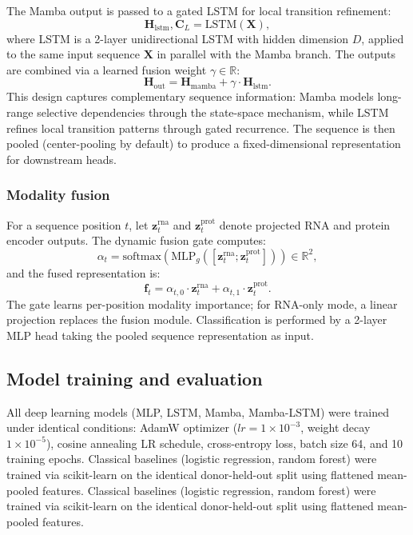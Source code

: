 \documentclass[11pt,twocolumn]{article}
\begin{document}
The Mamba output is passed to a gated LSTM for local transition refinement:
\begin{equation}
\mathbf{H}_{\text{lstm}}, \mathbf{C}_L = \text{LSTM}(\mathbf{X}),
\end{equation}
where LSTM is a 2-layer unidirectional LSTM with hidden dimension $D$, applied to the same input sequence $\mathbf{X}$ in parallel with the Mamba branch. The outputs are combined via a learned fusion weight $\gamma \in \mathbb{R}$:
\begin{equation}
\mathbf{H}_{\text{out}} = \mathbf{H}_{\text{mamba}} + \gamma \cdot \mathbf{H}_{\text{lstm}}.
\end{equation}
This design captures complementary sequence information: Mamba models long-range selective dependencies through the state-space mechanism, while LSTM refines local transition patterns through gated recurrence. The sequence is then pooled (center-pooling by default) to produce a fixed-dimensional representation for downstream heads.

\subsubsection{Modality fusion}

For a sequence position $t$, let $\mathbf{z}^{\mathrm{rna}}_t$ and $\mathbf{z}^{\mathrm{prot}}_t$ denote projected RNA and protein encoder outputs. The dynamic fusion gate computes:
\begin{equation}
\alpha_t = \text{softmax}\left(\text{MLP}_g([\mathbf{z}^{\mathrm{rna}}_t; \mathbf{z}^{\mathrm{prot}}_t])\right) \in \mathbb{R}^2,
\end{equation}
and the fused representation is:
\begin{equation}
\mathbf{f}_t = \alpha_{t,0} \cdot \mathbf{z}^{\mathrm{rna}}_t + \alpha_{t,1} \cdot \mathbf{z}^{\mathrm{prot}}_t.
\end{equation}
The gate learns per-position modality importance; for RNA-only mode, a linear projection replaces the fusion module. Classification is performed by a 2-layer MLP head taking the pooled sequence representation as input.

\subsection{Model training and evaluation}

All deep learning models (MLP, LSTM, Mamba, Mamba-LSTM) were trained under identical conditions: AdamW optimizer ($lr=1\times10^{-3}$, weight decay $1\times10^{-5}$), cosine annealing LR schedule, cross-entropy loss, batch size 64, and 10 training epochs. Classical baselines (logistic regression, random forest) were trained via scikit-learn on the identical donor-held-out split using flattened mean-pooled features. Classical baselines (logistic regression, random forest) were trained via scikit-learn on the identical donor-held-out split using flattened mean-pooled features.
\end{document}
